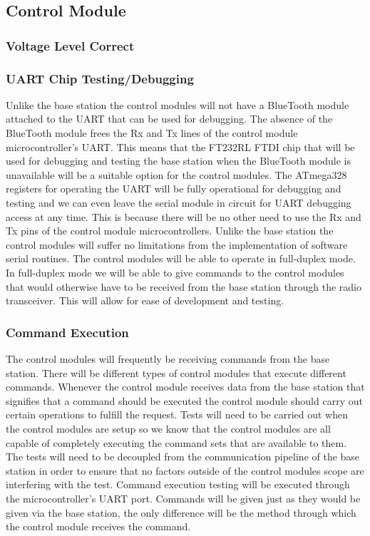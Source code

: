 \subsection{Control Module}

\subsubsection{Voltage Level Correct}

\subsubsection{UART Chip Testing/Debugging}
Unlike the base station the control modules will not have a BlueTooth module
attached to the UART that can be used for debugging. The absence of the
BlueTooth module frees the Rx and Tx lines of the control module
microcontroller{}'s UART. This means that the FT232RL FTDI chip that will be
used for debugging and testing the base station when the BlueTooth module is
unavailable will be a suitable option for the control modules. The ATmega328
registers for operating the UART will be fully operational for debugging and
testing and we can even leave the serial module in circuit for UART debugging
access at any time. This is because there will be no other need to use the Rx
and Tx pins of the control module microcontrollers. Unlike the base station the
control modules will suffer no limitations from the implementation of software
serial routines. The control modules will be able to operate in full{}-duplex
mode. In full{}-duplex mode we will be able to give commands to the control
modules that would otherwise have to be received from the base station through
the radio transceiver. This will allow for ease of development and testing.

\subsubsection{Command Execution}

The control modules will frequently be receiving commands from the base
station. There will be different types of control modules that execute
different commands. Whenever the control module receives data from the base
station that signifies that a command should be executed the control module
should carry out certain operations to fulfill the request. Tests will need to
be carried out when the control modules are setup so we know that the control
modules are all capable of completely executing the command sets that are
available to them. The tests will need to be decoupled from the communication
pipeline of the base station in order to ensure that no factors outside of the
control modules scope are interfering with the test. Command execution testing
will be executed through the microcontroller{}'s UART port. Commands will be
given just as they would be given via the base station, the only difference
will be the method through which the control module receives the command.

